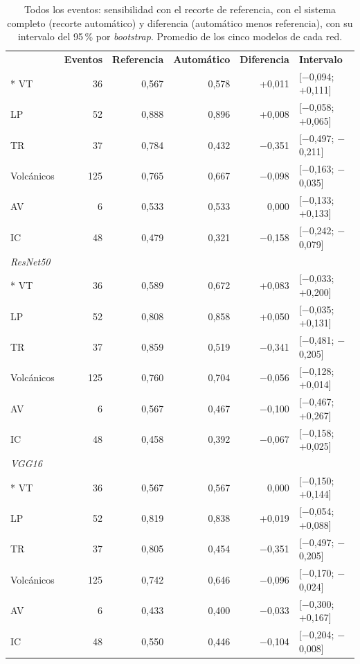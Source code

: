 {\small
\setlength{\tabcolsep}{3.5pt}
\begin{longtable}{lrrrrl}
\caption{Todos los eventos: sensibilidad con el recorte de referencia, con el
sistema completo (recorte automático) y diferencia (automático menos
referencia), con su intervalo del 95\,\% por \emph{bootstrap}. Promedio de los
cinco modelos de cada red.}\label{tab:res-referencia}\\
\cabecera{\textbf{Clase} & \textbf{Eventos} & \textbf{Referencia} & \textbf{Automático} & \textbf{Diferencia} & \textbf{Intervalo}}{6}
\multicolumn{6}{l}{\textit{EfficientNet-B0}}\\*
VT & 36 & 0,567 & 0,578 & +0,011 & [$-$0,094; +0,111] \\
LP & 52 & 0,888 & 0,896 & +0,008 & [$-$0,058; +0,065] \\
TR & 37 & 0,784 & 0,432 & $-$0,351 & [$-$0,497; $-$0,211] \\
Volcánicos & 125 & 0,765 & 0,667 & $-$0,098 & [$-$0,163; $-$0,035] \\
AV & 6 & 0,533 & 0,533 & 0,000 & [$-$0,133; +0,133] \\
IC & 48 & 0,479 & 0,321 & $-$0,158 & [$-$0,242; $-$0,079] \\
\midrule
\multicolumn{6}{l}{\textit{ResNet50}}\\*
VT & 36 & 0,589 & 0,672 & +0,083 & [$-$0,033; +0,200] \\
LP & 52 & 0,808 & 0,858 & +0,050 & [$-$0,035; +0,131] \\
TR & 37 & 0,859 & 0,519 & $-$0,341 & [$-$0,481; $-$0,205] \\
Volcánicos & 125 & 0,760 & 0,704 & $-$0,056 & [$-$0,128; +0,014] \\
AV & 6 & 0,567 & 0,467 & $-$0,100 & [$-$0,467; +0,267] \\
IC & 48 & 0,458 & 0,392 & $-$0,067 & [$-$0,158; +0,025] \\
\midrule
\multicolumn{6}{l}{\textit{VGG16}}\\*
VT & 36 & 0,567 & 0,567 & 0,000 & [$-$0,150; +0,144] \\
LP & 52 & 0,819 & 0,838 & +0,019 & [$-$0,054; +0,088] \\
TR & 37 & 0,805 & 0,454 & $-$0,351 & [$-$0,497; $-$0,205] \\
Volcánicos & 125 & 0,742 & 0,646 & $-$0,096 & [$-$0,170; $-$0,024] \\
AV & 6 & 0,433 & 0,400 & $-$0,033 & [$-$0,300; +0,167] \\
IC & 48 & 0,550 & 0,446 & $-$0,104 & [$-$0,204; $-$0,008] \\
\end{longtable}
}

